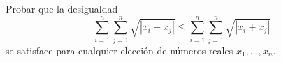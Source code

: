 Probar que la desigualdad
\[\sum_{i=1}^n \sum_{j=1}^n \sqrt{|x_i-x_j|}\leqslant \sum_{i=1}^n \sum_{j=1}^n \sqrt{|x_i+x_j|}\]
se satisface para cualquier elección de números reales $x_1, \dots , x_n$.
